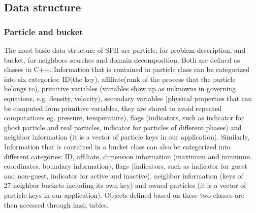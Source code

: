 \documentclass[conference,compsoc]{IEEEtran}
\begin{document}
\subsection{Data structure}
\subsubsection{Particle and bucket}
The most basic data structure of SPH are particle, for problem description, and bucket, for neighbors searches and domain decomposition. Both are defined as classes in C++. Information that is contained in particle class can be categorized into six categories: ID(the key), affiliate(rank of the process that the particle belongs to), primitive variables (variables show up as unknowns in governing equations, e.g. density, velocity), secondary variables (physical properties that can be computed from primitive variables, they are stored to avoid repeated computations eg. pressure, temperature), flags (indicators, such as indicator for ghost particle and real particles, indicator for particles of different phases) and neighbor information (it is a vector of particle keys in our application). Similarly,  Information that is contained in  a bucket class can also be categorized into different categories: ID, affiliate, dimension information (maximum and minimum coordinates, boundary information), flags (indicators, such as indicator for guest and non-guest, indicator for active and inactive), neighbor information (keys of 27 neighbor buckets including its own key) and owned particles (it is a vector of particle keys in our application). Objects defined based on these two classes are then accessed through hash tables.
\end{document}
